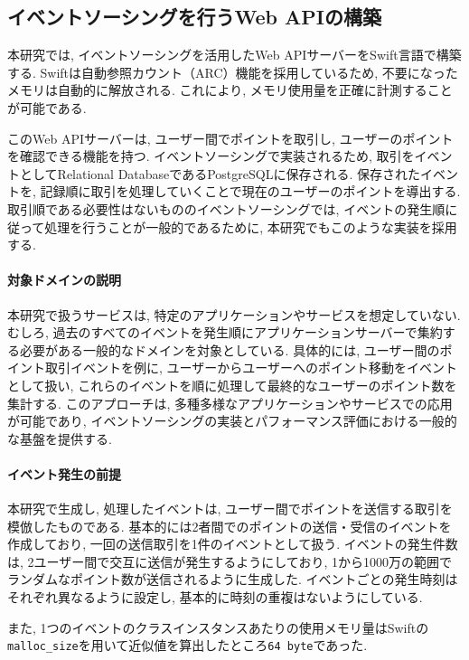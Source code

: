 \documentclass[../../../main]{subfiles}
\begin{document}
    \subsection{イベントソーシングを行うWeb APIの構築}\label{subsec:method-event_sourcing_api}

    本研究では, イベントソーシングを活用したWeb APIサーバーをSwift言語で構築する. Swiftは自動参照カウント（ARC）機能を採用しているため, 不要になったメモリは自動的に解放される. これにより, メモリ使用量を正確に計測することが可能である.

    このWeb APIサーバーは, ユーザー間でポイントを取引し, ユーザーのポイントを確認できる機能を持つ. イベントソーシングで実装されるため, 取引をイベントとしてRelational DatabaseであるPostgreSQLに保存される. 保存されたイベントを, 記録順に取引を処理していくことで現在のユーザーのポイントを導出する. 取引順である必要性はないもののイベントソーシングでは, イベントの発生順に従って処理を行うことが一般的であるために, 本研究でもこのような実装を採用する.

    \paragraph{対象ドメインの説明}
    本研究で扱うサービスは, 特定のアプリケーションやサービスを想定していない. むしろ, 過去のすべてのイベントを発生順にアプリケーションサーバーで集約する必要がある一般的なドメインを対象としている. 具体的には, ユーザー間のポイント取引イベントを例に, ユーザーからユーザーへのポイント移動をイベントとして扱い, これらのイベントを順に処理して最終的なユーザーのポイント数を集計する. このアプローチは, 多種多様なアプリケーションやサービスでの応用が可能であり, イベントソーシングの実装とパフォーマンス評価における一般的な基盤を提供する.

    \paragraph{イベント発生の前提}
    本研究で生成し, 処理したイベントは, ユーザー間でポイントを送信する取引を模倣したものである. 基本的には2者間でのポイントの送信・受信のイベントを作成しており, 一回の送信取引を1件のイベントとして扱う. イベントの発生件数は, 2ユーザー間で交互に送信が発生するようにしており, 1から1000万の範囲でランダムなポイント数が送信されるように生成した. イベントごとの発生時刻はそれぞれ異なるように設定し, 基本的に時刻の重複はないようにしている.

    また, 1つのイベントのクラスインスタンスあたりの使用メモリ量はSwiftの\texttt{malloc\_size}を用いて近似値を算出したところ\texttt{64 byte}であった.
\end{document}
